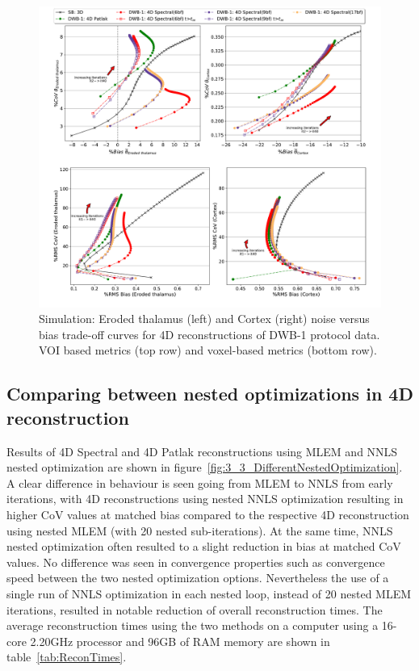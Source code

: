 \begin{figure} [ht!]
\centering
\includegraphics[scale=0.42,angle=0]{3_Results/3_2_Dynamic_Reconstruction_SimulationStudy/figures/VOI/3_2.pdf}
\caption{Simulation: Eroded thalamus (left) and Cortex (right) noise versus bias trade-off curves for 4D reconstructions of DWB-1 protocol data. 
VOI based metrics (top row) and voxel-based metrics (bottom row).}
\label{fig:3_2_DynamicModels}
\end{figure} 


\subsection*{Comparing between nested optimizations in 4D reconstruction}
Results of 4D Spectral and 4D Patlak reconstructions using MLEM and NNLS nested optimization are shown in figure~\ref{fig:3_3_DifferentNestedOptimization}. A clear difference in behaviour is seen going from MLEM to NNLS from early iterations, with 4D reconstructions using nested NNLS optimization resulting in higher CoV values at matched bias compared to the respective 4D reconstruction using nested MLEM (with 20 nested sub-iterations). At the same time, NNLS nested optimization often resulted to a slight reduction in bias at matched CoV values.
No difference was seen in convergence properties such as convergence speed between the two nested optimization options. 
Nevertheless the use of a single run of NNLS optimization in each nested loop, instead of 20 nested MLEM iterations, resulted in notable reduction of overall reconstruction times. The average reconstruction times using the two methods on a computer using a 16-core 2.20GHz processor and 96GB of RAM memory are shown in table~\ref{tab:ReconTimes}.

